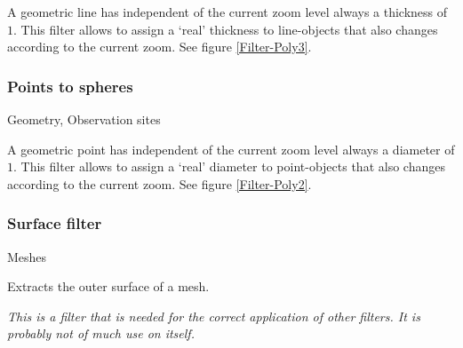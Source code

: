  A geometric line has independent of the current zoom level always a thickness of $1$. This filter allows to assign a `real' thickness to line-objects that also changes according to the current zoom. See figure \ref{Filter-Poly3}.

\subsubsection{Points to spheres}
 Geometry, Observation sites

 A geometric point has independent of the current zoom level always a diameter of $1$. This filter allows to assign a `real' diameter to point-objects that also changes according to the current zoom. See figure \ref{Filter-Poly2}.

\subsubsection{Surface filter}
 Meshes

 Extracts the outer surface of a mesh.

 \emph{This is a filter that is needed for the correct application of other filters. It is probably not of much use on itself.}
